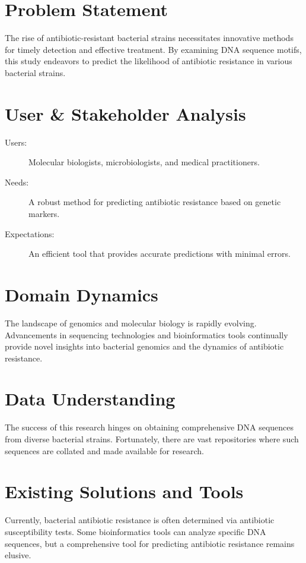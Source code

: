 \documentclass[12pt]{article}
\begin{document}
\section{Problem Statement}
The rise of antibiotic-resistant bacterial strains necessitates innovative methods for timely detection and effective treatment. By examining DNA sequence motifs, this study endeavors to predict the likelihood of antibiotic resistance in various bacterial strains.

\section{User \& Stakeholder Analysis}
\begin{description}
    \item[Users:] Molecular biologists, microbiologists, and medical practitioners.
    \item[Needs:] A robust method for predicting antibiotic resistance based on genetic markers.
    \item[Expectations:] An efficient tool that provides accurate predictions with minimal errors.
\end{description}

\section{Domain Dynamics}
The landscape of genomics and molecular biology is rapidly evolving. Advancements in sequencing technologies and bioinformatics tools continually provide novel insights into bacterial genomics and the dynamics of antibiotic resistance.

\section{Data Understanding}
The success of this research hinges on obtaining comprehensive DNA sequences from diverse bacterial strains. Fortunately, there are vast repositories where such sequences are collated and made available for research.

\section{Existing Solutions and Tools}
Currently, bacterial antibiotic resistance is often determined via antibiotic susceptibility tests. Some bioinformatics tools can analyze specific DNA sequences, but a comprehensive tool for predicting antibiotic resistance remains elusive.
\end{document}
